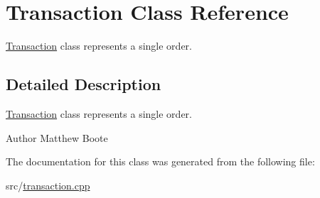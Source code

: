 \hypertarget{classTransaction}{}\section{Transaction Class Reference}
\label{classTransaction}


\hyperlink{classTransaction}{Transaction} class represents a single order.  




\subsection{Detailed Description}
\hyperlink{classTransaction}{Transaction} class represents a single order. 

\begin{DoxyAuthor}{Author}
Matthew Boote 
\end{DoxyAuthor}


The documentation for this class was generated from the following file\+:\begin{DoxyCompactItemize}
\item 
src/\hyperlink{transaction_8cpp}{transaction.\+cpp}\end{DoxyCompactItemize}
